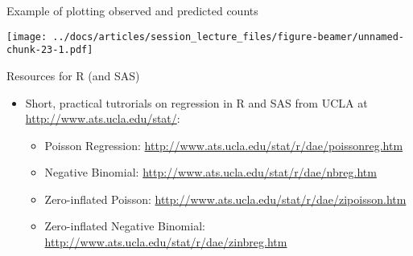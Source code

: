 \documentclass[
  ignorenonframetext,
]{beamer}
\providecommand{\tightlist}{%
  \setlength{\itemsep}{0pt}\setlength{\parskip}{0pt}}
\begin{document}
\begin{frame}{Example of plotting observed and predicted counts}
\protect\hypertarget{example-of-plotting-observed-and-predicted-counts}{}

\texttt{[image: ../docs/articles/session\_lecture\_files/figure-beamer/unnamed-chunk-23-1.pdf]}

\end{frame}

\begin{frame}{Resources for R (and SAS)}
\protect\hypertarget{resources-for-r-and-sas}{}

\begin{itemize}
\tightlist
\item
  Short, practical tutrorials on regression in R and SAS from UCLA at
  \url{http://www.ats.ucla.edu/stat/}:

  \begin{itemize}
  \tightlist
  \item
    Poisson Regression:
    \url{http://www.ats.ucla.edu/stat/r/dae/poissonreg.htm}
  \item
    Negative Binomial:
    \url{http://www.ats.ucla.edu/stat/r/dae/nbreg.htm}
  \item
    Zero-inflated Poisson:
    \url{http://www.ats.ucla.edu/stat/r/dae/zipoisson.htm}
  \item
    Zero-inflated Negative Binomial:
    \url{http://www.ats.ucla.edu/stat/r/dae/zinbreg.htm}
  \end{itemize}
\end{itemize}

\end{frame}
\end{document}
